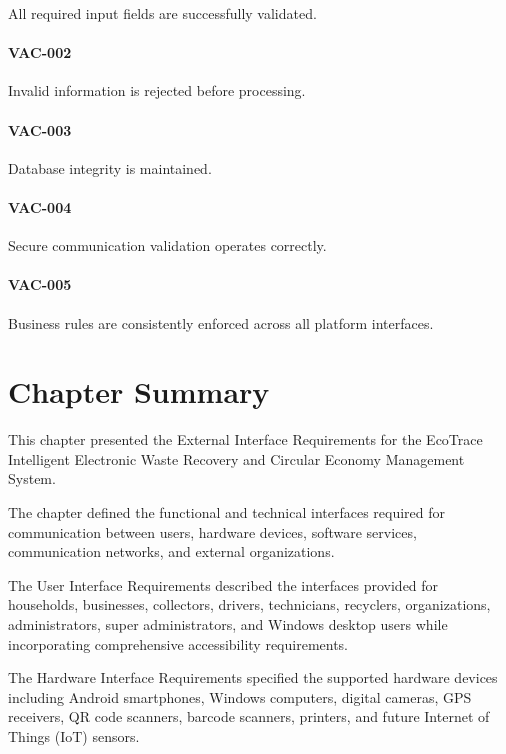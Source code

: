 All required input fields are successfully validated.

\paragraph{VAC-002}

Invalid information is rejected before processing.

\paragraph{VAC-003}

Database integrity is maintained.

\paragraph{VAC-004}

Secure communication validation operates correctly.

\paragraph{VAC-005}

Business rules are consistently enforced across all platform interfaces.


\section{Chapter Summary}

This chapter presented the External Interface Requirements for the
EcoTrace Intelligent Electronic Waste Recovery and Circular Economy
Management System.

The chapter defined the functional and technical interfaces required for
communication between users, hardware devices, software services,
communication networks, and external organizations.

The User Interface Requirements described the interfaces provided for
households, businesses, collectors, drivers, technicians, recyclers,
organizations, administrators, super administrators, and Windows
desktop users while incorporating comprehensive accessibility
requirements.

The Hardware Interface Requirements specified the supported hardware
devices including Android smartphones, Windows computers, digital
cameras, GPS receivers, QR code scanners, barcode scanners, printers,
and future Internet of Things (IoT) sensors.


